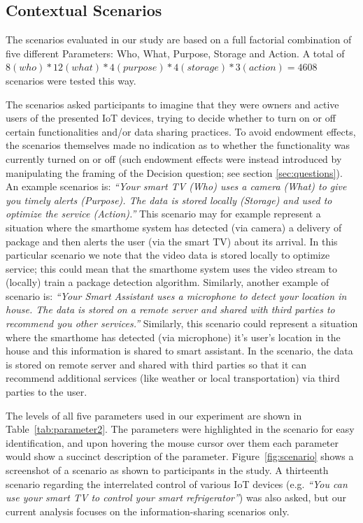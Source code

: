 \subsection{Contextual Scenarios}
The scenarios evaluated in our study are based on a full factorial combination of five different Parameters: Who, What, Purpose, Storage and Action. A total of $8(who)*12(what)*4(purpose)*4(storage)*3(action) = 4608$ scenarios were tested this way. 

The scenarios asked participants to imagine that they were owners and active users of the presented IoT devices, trying to decide whether to turn on or off certain functionalities and/or data sharing practices. To avoid endowment effects, the scenarios themselves made no indication as to whether the functionality was currently turned on or off (such endowment effects were instead introduced by manipulating the framing of the Decision question; see section \ref{sec:questions}). An example scenarios is: \emph{``Your smart TV (Who) uses a camera (What) to give you timely alerts (Purpose). The data is stored locally (Storage) and used to optimize the service (Action).''} This scenario may for example represent a situation where the smarthome system has detected (via camera) a delivery of package and then alerts the user (via the smart TV) about its arrival. In this particular scenario we note that the video data is stored locally to optimize service; this could mean that the smarthome system uses the video stream to (locally) train a package detection algorithm. Similarly, another example of scenario is: \emph{``Your Smart Assistant uses a microphone to detect your location in house. The data is stored on a remote server and shared with third parties to recommend you other services.''} Similarly, this scenario could represent a situation where the smarthome has detected (via microphone) it's user's location in the house and this information is shared to smart assistant. In the scenario, the data is stored on remote server and shared with third parties so that it can recommend additional services (like weather or local transportation) via third parties to the user.

The levels of all five parameters used in our experiment are shown in Table~\ref{tab:parameter2}. The parameters were highlighted in the scenario for easy identification, and upon hovering the mouse cursor over them each parameter would show a succinct description of the parameter. Figure~\ref{fig:scenario} shows a screenshot of a scenario as shown to participants in the study. A thirteenth scenario regarding the interrelated control of various IoT devices (e.g. \emph{``You can use your smart TV to control your smart refrigerator''}) was also asked, but our current analysis focuses on the information-sharing scenarios only.

